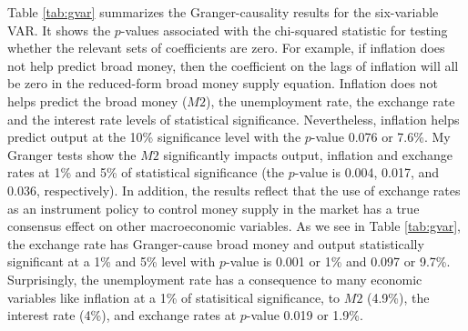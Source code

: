 \documentclass[11pt]{article}
\begin{document}
Table \ref{tab:gvar} summarizes the Granger-causality results for the six-variable VAR. It shows the $p$-values associated with the chi-squared statistic for testing whether the relevant sets of coefficients are zero. For example, if inflation does not help predict broad money, then the coefficient on the lags of inflation will all be zero in the reduced-form broad money supply equation. Inflation does not helps predict the broad money ($M2$), the unemployment rate, the exchange rate and the interest rate levels of statistical significance. Nevertheless, inflation helps predict output at the 10\% significance level with the $p$-value 0.076 or 7.6\%. My Granger tests show the $M2$ significantly impacts output, inflation and exchange rates at 1\% and 5\% of statistical significance (the $p$-value is 0.004, 0.017, and 0.036, respectively). In addition, the results reflect that the use of exchange rates as an instrument policy to control money supply in the market has a true consensus effect on other macroeconomic variables. As we see in Table \ref{tab:gvar}, the exchange rate has Granger-cause broad money and output statistically significant at a 1\% and 5\% level with $p$-value is 0.001 or 1\% and 0.097 or 9.7\%. Surprisingly, the unemployment rate has a consequence to many economic variables like inflation at a 1\% of statisitical significance, to $M2$ (4.9\%), the interest rate (4\%), and exchange rates at $p$-value 0.019 or 1.9\%.


\clearpage\newpage
\printbibliography
\clearpage

\ifGDTEndfloat
  \processdelayedfloats
\fi

\end{document}
